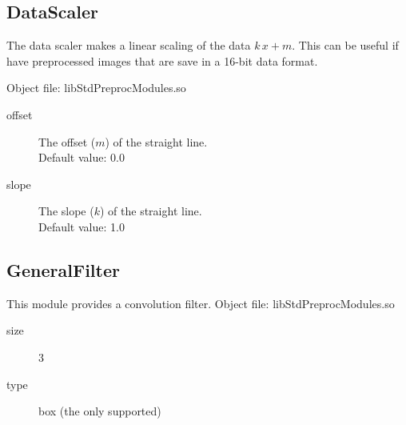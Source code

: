 \documentclass[a4paper]{scrreprt}
\begin{document}
\subsection{DataScaler}
The data scaler makes a linear scaling of the data $k\,x+m$. This can be useful if have preprocessed images that are save in a 16-bit data format.

Object file: libStdPreprocModules.so
\begin{description}
 \item[offset] The offset ($m$) of the straight line. \\Default value: 0.0
 \item[slope] The slope ($k$) of the straight line. \\Default value: 1.0
\end{description}

\subsection{GeneralFilter}
This module provides a convolution filter. 
Object file: libStdPreprocModules.so
\begin{description}
 \item[size]3
 \item[type]box (the only supported)
\end{description}
\end{document}
